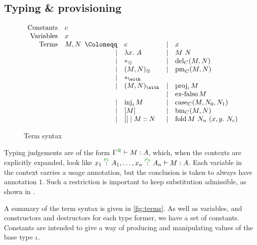 \subsection{Typing \& provisioning}
\label{sec:rules}

\begin{figure}
  \begin{displaymath}
    \begin{array}{rl}
      \textrm{Constants} & c \\
      \textrm{Variables} & x \\
      \textrm{Terms} & M, N
                       \begin{array}[t]{rlcl}
                         \Coloneqq & c & \mid & x \\
                         \mid & \lam{x}{A} & \mid & \app{M}{N} \\
                         \mid & \unit & \mid & \del{C}{M}{N} \\
                         \mid & \ten{M}{N} & \mid & \prm{C}{M}{x}{y}{N} \\
                         \mid & \eat & & \\
                         \mid & \wth{M}{N} & \mid & \proj{i}{M} \\
                                   & & \mid & \exf{C}{M} \\ 
                         \mid & \inj{i}{M} & \mid & \cse{C}{M}{x}{N_0}{y}{N_1} \\
                         \mid & \bang{M} & \mid & \bm{C}{M}{x}{N} \\
                         \mid & \nil \mid \cons{M}{N} & \mid & \fold{M}{N_n}{x}{y}{N_c}
                       \end{array}
    \end{array}
  \end{displaymath}
  \caption{Term syntax}
  \label{fig:terms}
\end{figure}

Typing judgements are of the form $\ctx{\Gamma}{R} \vdash M : A$, which, when
the contexts are explicitly expanded, look like
$\ctxvar{x_1}{A_1}{\rho_1}, \ldots, \ctxvar{x_n}{A_n}{\rho_n} \vdash M : A$.
Each variable in the context carries a usage annotation, but the conclusion
is taken to always have annotation $1$.
Such a restriction is important to keep substitution admissible, as shown in
\cite{quantitative-type-theory}. 

A summary of the term syntax is given in \autoref{fig:terms}.
As well as variables, and constructors and destructors for each type former, we
have a set of constants.
Constants are intended to give a way of producing and manipulating values of the
base type $\iota$.

